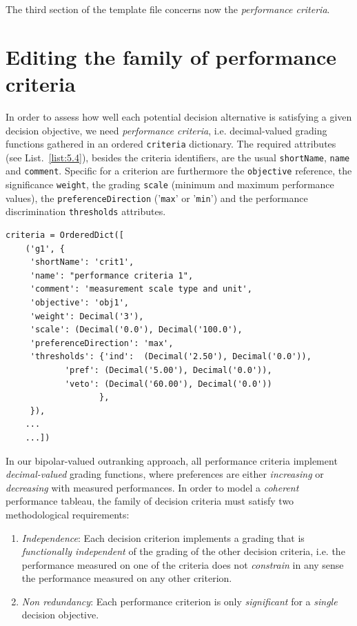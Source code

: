 The third section of the template file concerns now the \emph{performance criteria}.

\section{Editing the family of performance criteria}
\label{sec:5.4}

In order to assess how well each potential decision alternative is satisfying a given decision objective, we need \emph{performance criteria}, i.e. decimal-valued grading functions gathered in an ordered \texttt{criteria} dictionary. The required attributes (see List.~\vref{list:5.4}), besides the criteria identifiers, are the usual \texttt{shortName}, \texttt{name} and \texttt{comment}. Specific for a criterion are furthermore the \texttt{objective} reference, the significance \texttt{weight}, the grading \texttt{scale} (minimum and  maximum performance values), the \texttt{preferenceDirection} ('\texttt{max}' or '\texttt{min}') and the performance discrimination \texttt{thresholds} attributes.
\begin{lstlisting}[caption={Example of performance criteria description},label=list:5.4]
   criteria = OrderedDict([
    ('g1', {
     'shortName': 'crit1',
     'name': "performance criteria 1",
     'comment': 'measurement scale type and unit',
     'objective': 'obj1',
     'weight': Decimal('3'),
     'scale': (Decimal('0.0'), Decimal('100.0'),
     'preferenceDirection': 'max',
     'thresholds': {'ind':  (Decimal('2.50'), Decimal('0.0')),
		    'pref': (Decimal('5.00'), Decimal('0.0')),
		    'veto': (Decimal('60.00'), Decimal('0.0'))
                   },
     }),
    ...
    ...])
\end{lstlisting}

In our bipolar-valued outranking approach, all performance criteria implement \emph{decimal-valued} grading functions, where preferences are either \emph{increasing} or \emph{decreasing} with measured performances. In order to model a \emph{coherent} performance tableau, the family of decision criteria must satisfy two methodological requirements:
\begin{enumerate}[leftmargin=1cm,topsep=1pt]
  \item \emph{Independence}: Each decision criterion implements a grading that is \emph{functionally independent} of the grading of the other decision criteria, i.e. the performance measured on one of the criteria does not \emph{constrain} in any sense the performance measured on any other criterion.
  \item \emph{Non redundancy}: Each performance criterion is only \emph{significant} for a \emph{single} decision objective.
\end{enumerate}

